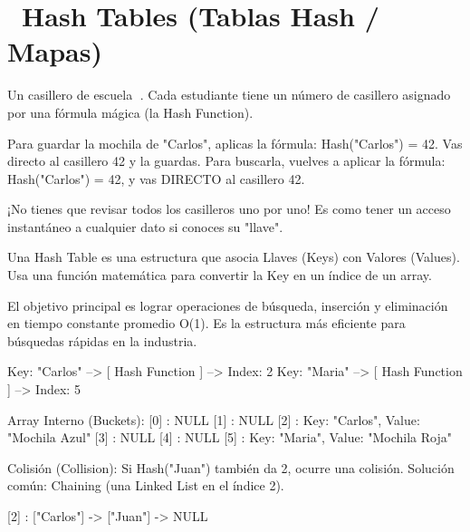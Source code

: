 ﻿\chapter[\emj{🗃️}~Hash Tables (Tablas Hash / Mapas)]{~Hash Tables (Tablas Hash / Mapas)}

\begin{dsaquees}

Un casillero de escuela 🎒. Cada estudiante tiene un número de
casillero asignado por una fórmula mágica (la Hash Function).

Para guardar la mochila de "Carlos", aplicas la fórmula: 
Hash("Carlos") = 42. Vas directo al casillero 42 y la guardas. 
Para buscarla, vuelves a aplicar la fórmula: Hash("Carlos") = 42,
y vas DIRECTO al casillero 42.

¡No tienes que revisar todos los casilleros uno por uno! Es como 
tener un acceso instantáneo a cualquier dato si conoces su "llave".

\end{dsaquees}

\begin{dsaotraforma}

Una Hash Table es una estructura que asocia Llaves (Keys) con Valores
(Values). Usa una función matemática para convertir la Key en un 
índice de un array.

El objetivo principal es lograr operaciones de búsqueda, inserción y 
eliminación en tiempo constante promedio O(1). Es la estructura más 
eficiente para búsquedas rápidas en la industria.

\end{dsaotraforma}

\begin{dsadiagrama}
Key: "Carlos"  --> [ Hash Function ] --> Index: 2
Key: "Maria"   --> [ Hash Function ] --> Index: 5

Array Interno (Buckets):
[0] : NULL
[1] : NULL
[2] : {Key: "Carlos", Value: "Mochila Azul"}
[3] : NULL
[4] : NULL
[5] : {Key: "Maria",  Value: "Mochila Roja"}

Colisión (Collision):
Si Hash("Juan") también da 2, ocurre una colisión. 
Solución común: Chaining (una Linked List en el índice 2).

[2] : ["Carlos"] -> ["Juan"] -> NULL
\end{dsadiagrama}

